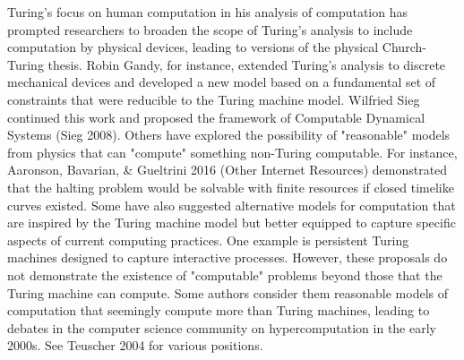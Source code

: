 \documentclass[10pt,a4paper]{article}
\begin{document}
                Turing's focus on human computation in his analysis of computation has prompted researchers to broaden the scope of Turing's analysis to include computation by physical devices, leading to versions of the physical Church-Turing thesis. Robin Gandy, for instance, extended Turing's analysis to discrete mechanical devices and developed a new model based on a fundamental set of constraints that were reducible to the Turing machine model. Wilfried Sieg continued this work and proposed the framework of Computable Dynamical Systems (Sieg 2008). Others have explored the possibility of "reasonable" models from physics that can "compute" something non-Turing computable. For instance, Aaronson, Bavarian, \& Gueltrini 2016 (Other Internet Resources) demonstrated that the halting problem would be solvable with finite resources if closed timelike curves existed. Some have also suggested alternative models for computation that are inspired by the Turing machine model but better equipped to capture specific aspects of current computing practices. One example is persistent Turing machines designed to capture interactive processes. However, these proposals do not demonstrate the existence of "computable" problems beyond those that the Turing machine can compute. Some authors consider them reasonable models of computation that seemingly compute more than Turing machines, leading to debates in the computer science community on hypercomputation in the early 2000s. See Teuscher 2004 for various positions.\cite{sep-turing-machine}
\end{document}
